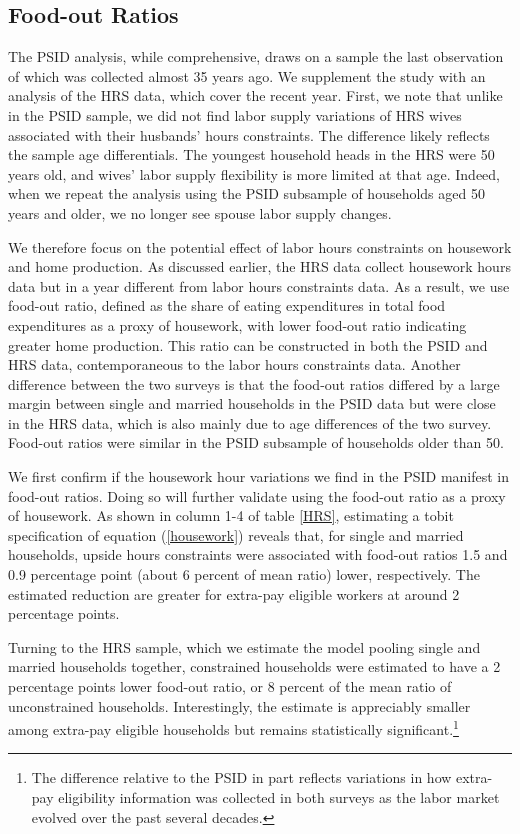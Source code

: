 \subsection{Food-out Ratios}
The PSID analysis, while comprehensive, draws on a sample the last observation of which was collected almost 35 years ago.  We supplement the study with an analysis of the HRS data, which cover the recent year. First, we note that unlike in the PSID sample, we did not find labor supply variations of HRS wives associated with their husbands' hours constraints. The difference likely reflects the sample age differentials.  The youngest household heads in the HRS were 50 years old, and wives' labor supply flexibility is more limited at that age.  Indeed, when we repeat the analysis using the PSID subsample of households aged 50 years and older, we no longer see spouse labor supply changes.
 
We therefore focus on the potential effect of labor hours constraints on housework and home production.  As discussed earlier, the HRS data collect housework hours data but in a year different from labor hours constraints data. As a result, we use food-out ratio, defined as the share of eating expenditures in total food expenditures as a proxy of housework, with lower food-out ratio indicating greater home production. This ratio can be constructed in both the PSID and HRS data, contemporaneous to the labor hours constraints data. Another difference between the two surveys is that the food-out ratios differed by a large margin between single and married households in the PSID data but were close in the HRS data, which is also mainly due to age differences of the two survey. Food-out ratios were similar in the PSID subsample of households older than 50.

We first confirm if the housework hour variations we find in the PSID manifest in food-out ratios. Doing so will further validate using the food-out ratio as a proxy of housework. As shown in column 1-4 of table \ref{HRS}, estimating a tobit specification of equation (\ref{housework}) reveals that, for single and married households, upside hours constraints were associated with food-out ratios 1.5 and 0.9 percentage point (about 6 percent of mean ratio) lower, respectively.  The estimated reduction are greater for extra-pay eligible workers at around 2 percentage points.

Turning to the HRS sample, which we estimate the model pooling single and married households together, constrained households were estimated to have a 2 percentage points lower food-out ratio, or 8 percent of the mean ratio of unconstrained households. Interestingly, the estimate is appreciably smaller among extra-pay eligible households but remains statistically significant.\footnote{The difference relative to the PSID in part reflects variations in how extra-pay eligibility information was collected in both surveys as the labor market evolved over the past several decades.}
